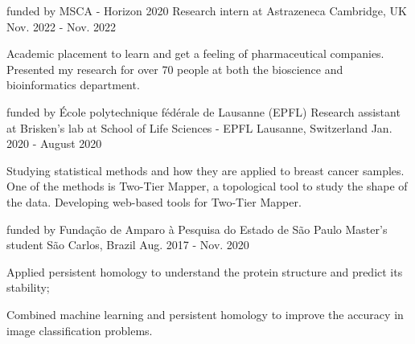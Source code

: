 

\begin{cventries}

  \cventry
    {funded by MSCA - Horizon 2020}
    {Research intern at Astrazeneca}
    {Cambridge, UK} 
    {Nov. 2022 - Nov. 2022} 
    {
      \begin{cvitems} 
        \item {Academic placement to learn and get a feeling of
            pharmaceutical companies. Presented my research for
            over 70 people at both the bioscience and 
            bioinformatics department.}
      \end{cvitems} 
    }
\begin{cventries}

  \cventry
    {funded by École polytechnique fédérale de Lausanne (EPFL)}
    {Research assistant at Brisken's lab at School of Life Sciences - EPFL}
    {Lausanne, Switzerland} 
    {Jan. 2020 - August 2020} 
    {
      \begin{cvitems} 
        \item {Studying statistical methods and how they are applied 
            to breast cancer samples. One of the methods is 
            Two-Tier Mapper, a topological tool to study the shape of the data.
            Developing web-based tools for Two-Tier Mapper.}
      \end{cvitems} 
    }
  \cventry
    {funded by Fundação de Amparo à Pesquisa do Estado de São Paulo} %
    {Master's student} %
    {São Carlos, Brazil} %
    {Aug. 2017 - Nov. 2020} %
    {
      \begin{cvitems} %
        \item {Applied persistent homology to understand the protein structure
        and predict its stability;}
        \item {Combined machine learning and persistent homology to improve
        the accuracy in image classification problems.}
      \end{cvitems}
    }


\end{cventries}
\end{cventries}
